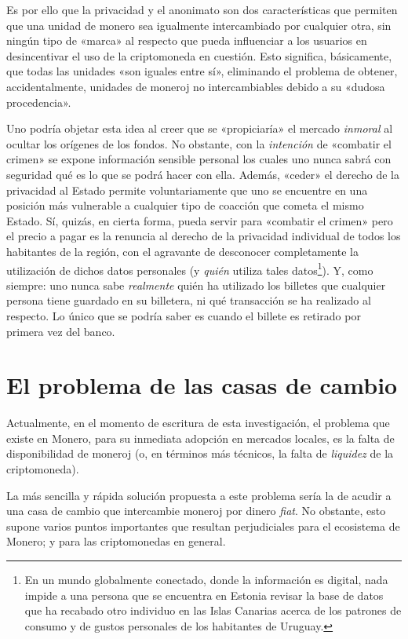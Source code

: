 \documentclass[12pt,a4paper,twoside]{book}
\begin{document}
Es por ello que la privacidad y el anonimato son dos características que permiten que una unidad de monero sea igualmente intercambiado por cualquier otra, sin ningún tipo de «marca» al respecto que pueda influenciar a los usuarios en desincentivar el uso de la criptomoneda en cuestión. Esto significa, básicamente, que todas las unidades «son iguales entre sí», eliminando el problema de obtener, accidentalmente, unidades de moneroj no intercambiables debido a su «dudosa procedencia».

Uno podría objetar esta idea al creer que se «propiciaría» el mercado \textit{inmoral} al ocultar los orígenes de los fondos. No obstante, con la \textit{intención} de «combatir el crimen» se expone información sensible personal los cuales uno nunca sabrá con seguridad qué es lo que se podrá hacer con ella. Además, «ceder» el derecho de la privacidad al Estado permite voluntariamente que uno se encuentre en una posición más vulnerable a cualquier tipo de coacción que cometa el mismo Estado. Sí, quizás, en cierta forma, pueda servir para «combatir el crimen» pero el precio a pagar es la renuncia al derecho de la privacidad individual de todos los habitantes de la región, con el agravante de desconocer completamente la utilización de dichos datos personales (y \textit{quién} utiliza tales datos\footnote{En un mundo globalmente conectado, donde la información es digital, nada impide a una persona que se encuentra en Estonia revisar la base de datos que ha recabado otro individuo en las Islas Canarias acerca de los patrones de consumo y de gustos personales de los habitantes de Uruguay.}). Y, como siempre: uno nunca sabe \textit{realmente} quién ha utilizado los billetes que cualquier persona tiene guardado en su billetera, ni qué transacción se ha realizado al respecto. Lo único que se podría saber es cuando el billete es retirado por primera vez del banco.

\section{El problema de las casas de cambio}
Actualmente, en el momento de escritura de esta investigación, el problema que existe en Monero, para su inmediata adopción en mercados locales, es la falta de disponibilidad de moneroj (o, en términos más técnicos, la falta de \textit{liquidez} de la criptomoneda).

La más sencilla y rápida solución propuesta a este problema sería la de acudir a una casa de cambio que intercambie moneroj por dinero \textit{fiat}. No obstante, esto supone varios puntos importantes que resultan perjudiciales para el ecosistema de Monero; y para las criptomonedas en general.
\end{document}
